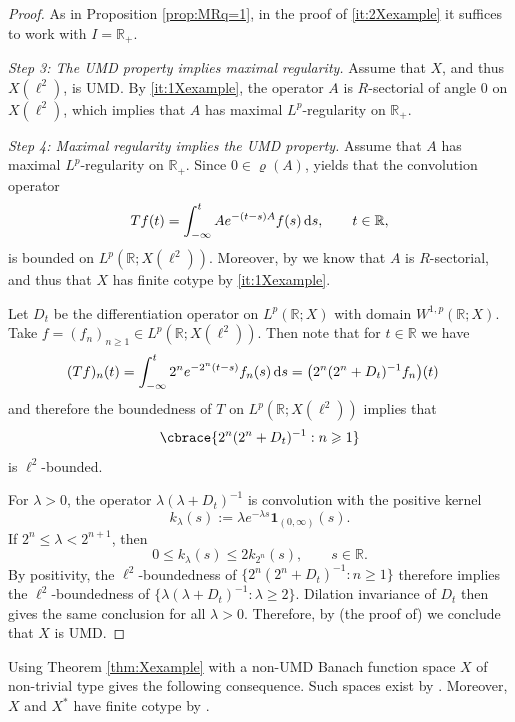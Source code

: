\documentclass{amsart}
\let\leq\leqslant
\let\geq\geqslant
\theoremstyle{plain}
\theoremstyle{remark}
\theoremstyle{plain}
\numberwithin{equation}{section}
\newcommand{\R}{\mathbb R}
\newcommand{\1}{\mathbf 1}
\newcommand{\dd}{\,{\rm d}}
\DeclarePairedDelimiter\cbrace\{\}
\begin{document}
\begin{proof}
As  in Proposition \ref{prop:MRq=1}, in the proof of \ref{it:2Xexample} it suffices to work with $I=\R_+$.

\smallskip
{\em Step 3: The UMD property implies maximal regularity.}
Assume that $X$, and thus $X(\ell^2)$, is UMD. By \ref{it:1Xexample}, the operator $A$ is $R$-sectorial of angle $0$ on $X(\ell^2)$, which implies that $A$ has maximal $L^p$-regularity on $\R_+$.

\smallskip
{\em Step 4: Maximal regularity implies the UMD property.}
Assume that $A$ has maximal $L^p$-regularity on $\R_+$. Since $0\in\varrho(A)$, \cite[Theorem 17.3.31]{HNVW3} yields that the convolution operator
\[
        Tf(t)=\int_{-\infty}^t Ae^{-(t-s)A}f(s)\dd s,
        \qquad t\in\R,
\]
is bounded on $L^p(\R;X(\ell^2))$. Moreover, by \cite[Theorem 17.3.1]{HNVW3} we know that $A$ is $R$-sectorial, and thus that $X$ has finite cotype by \ref{it:1Xexample}.

 Let $D_t$ be the differentiation operator on $L^p(\mathbb R;X)$ with domain $W^{1,p}(\mathbb R;X)$. Take $f = (f_n)_{n\geq 1}  \in L^p(\mathbb R;X(\ell^2))$. Then note that for $t \in \R$ we have
\begin{align*}
  (Tf)_n(t) &=\int_{-\infty}^t 2^ne^{-2^n(t-s)}f_n(s)\dd s= \bigl(2^n(2^n+D_t)^{-1}f_n\bigr)(t)
\end{align*}
and therefore the boundedness of $T$ on $L^p(\mathbb{R};X(\ell^2))$ implies that
\begin{align*}
  \cbrace{2^n(2^n+D_t)^{-1}:n\geq 1}
\end{align*}
is $\ell^2$-bounded.

For $\lambda>0$, the operator
$\lambda(\lambda+D_t)^{-1}$ is convolution with the positive kernel
\[
        k_\lambda(s) := \lambda e^{-\lambda s}\1_{(0,\infty)}(s).
\]
If $2^n\leq\lambda<2^{n+1}$, then
\[
        0\leq k_\lambda(s)\leq 2k_{2^n}(s),  \qquad s\in\R.
\]
By positivity, the $\ell^2$-boundedness of $\{2^n(2^n+D_t)^{-1}:n\geq1\}$ therefore implies the $\ell^2$-boundedness of $\{\lambda(\lambda+D_t)^{-1}:\lambda\geq2\}.$ Dilation invariance of $D_t$ then gives the same conclusion for all $\lambda>0$. Therefore, by (the proof of) \cite[Theorem 2.4.9]{KLW19} we conclude that $X$ is UMD.
\end{proof}

Using Theorem \ref{thm:Xexample} with a non-UMD Banach function space $X$ of non-trivial type gives the following consequence. Such spaces exist by \cite[Section 4.3.c]{HNVW1}. Moreover, $X$ and $X^*$ have finite cotype by \cite[Proposition 7.1.13 and Theorem 7.1.14]{HNVW2}.
\end{document}
